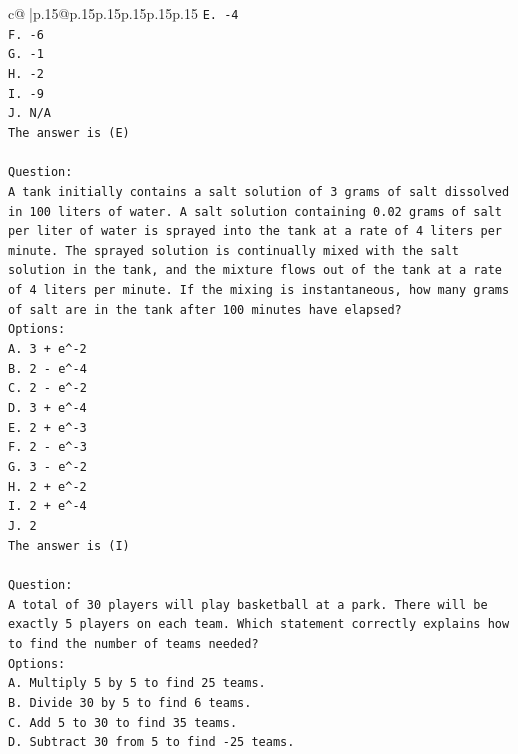 \documentclass{article}
\begin{document}
{\begin{supertabular}{c@{$\;$}|p{.15\linewidth}@{}p{.15\linewidth}p{.15\linewidth}p{.15\linewidth}p{.15\linewidth}p{.15\linewidth}}
{{{\texttt{E. {-}4} \\
\texttt{F. {-}6} \\
\texttt{G. {-}1} \\
\texttt{H. {-}2} \\
\texttt{I. {-}9} \\
\texttt{J. N/A} \\
\texttt{The answer is (E)} \\
\\ 
\texttt{Question:} \\
\texttt{A tank initially contains a salt solution of 3 grams of salt dissolved in 100 liters of water. A salt solution containing 0.02 grams of salt per liter of water is sprayed into the tank at a rate of 4 liters per minute. The sprayed solution is continually mixed with the salt solution in the tank, and the mixture flows out of the tank at a rate of 4 liters per minute. If the mixing is instantaneous, how many grams of salt are in the tank after 100 minutes have elapsed?} \\
\texttt{Options:} \\
\texttt{A. 3 + e\^{}{-}2} \\
\texttt{B. 2 {-} e\^{}{-}4} \\
\texttt{C. 2 {-} e\^{}{-}2} \\
\texttt{D. 3 + e\^{}{-}4} \\
\texttt{E. 2 + e\^{}{-}3} \\
\texttt{F. 2 {-} e\^{}{-}3} \\
\texttt{G. 3 {-} e\^{}{-}2} \\
\texttt{H. 2 + e\^{}{-}2} \\
\texttt{I. 2 + e\^{}{-}4} \\
\texttt{J. 2} \\
\texttt{The answer is (I)} \\
\\ 
\texttt{Question:} \\
\texttt{A total of 30 players will play basketball at a park. There will be exactly 5 players on each team. Which statement correctly explains how to find the number of teams needed?} \\
\texttt{Options:} \\
\texttt{A. Multiply 5 by 5 to find 25 teams.} \\
\texttt{B. Divide 30 by 5 to find 6 teams.} \\
\texttt{C. Add 5 to 30 to find 35 teams.} \\
\texttt{D. Subtract 30 from 5 to find {-}25 teams.} \\
}}}
\end{supertabular}}
\end{document}
